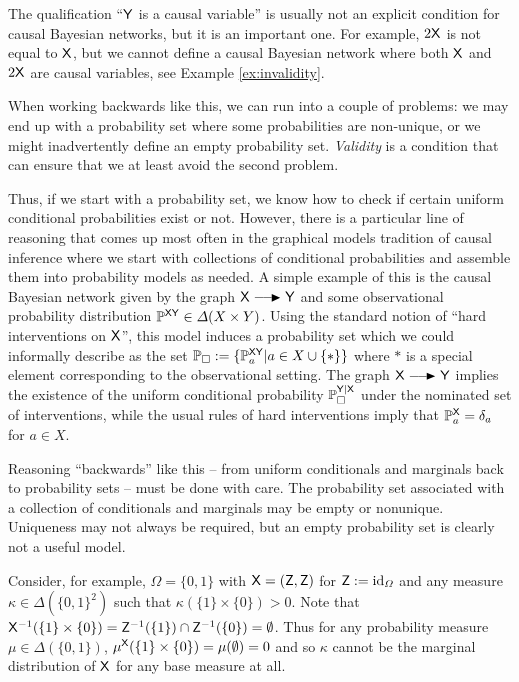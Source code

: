 The qualification ``$\mathsf{Y}$ is a causal variable'' is usually not an explicit condition for causal Bayesian networks, but it is an important one. For example, $2\mathsf{X}$ is not equal to $\mathsf{X}$, but we cannot define a causal Bayesian network where both $\mathsf{X}$ and $2\mathsf{X}$ are causal variables, see Example \ref{ex:invalidity}.

When working backwards like this, we can run into a couple of problems: we may end up with a probability set where some probabilities are non-unique, or we might inadvertently define an empty probability set. \emph{Validity} is a condition that can ensure that we at least avoid the second problem.

Thus, if we start with a probability set, we know how to check if certain uniform conditional probabilities exist or not. However, there is a particular line of reasoning that comes up most often in the graphical models tradition of causal inference where we start with collections of conditional probabilities and assemble them into probability models as needed. A simple example of this is the causal Bayesian network given by the graph $\RV{X}\longrightarrowRHD \RV{Y}$ and some observational probability distribution $\mathbb{P}^{\mathsf{XY}}\in\Delta(X\times Y)$. Using the standard notion of ``hard interventions on $\mathsf{X}$'', this model induces a probability set which we could informally describe as the set $\mathbb{P}_\square:=\{\mathbb{P}_a^{\mathsf{XY}}|a\in X\cup\{*\}\}$ where $*$ is a special element corresponding to the observational setting. The graph $\RV{X}\longrightarrowRHD \RV{Y}$ implies the existence of the uniform conditional probability $\mathbb{P}_\square^{\mathsf{Y}|\mathsf{X}}$ under the nominated set of interventions, while the usual rules of hard interventions imply that $\mathbb{P}_a^{\mathsf{X}} = \delta_a$ for $a\in X$.

Reasoning ``backwards'' like this -- from uniform conditionals and marginals back to probability sets -- must be done with care. The probability set associated with a collection of conditionals and marginals may be empty or nonunique. Uniqueness may not always be required, but an empty probability set is clearly not a useful model.

Consider, for example, $\Omega=\{0,1\}$ with $\mathsf{X}=(\mathsf{Z},\mathsf{Z})$ for $\mathsf{Z}:=\text{id}_{\Omega}$ and any measure $\kappa\in \Delta(\{0,1\}^2)$ such that $\kappa(\{1\}\times \{0\})>0$. Note that $\mathsf{X}^{-1}(\{1\}\times \{0\})=\mathsf{Z}^{-1}(\{1\})\cap \mathsf{Z}^{-1}(\{0\})=\emptyset$. Thus for any probability measure $\mu\in \Delta(\{0,1\})$, $\mu^{\mathsf{X}}(\{1\}\times \{0\}) = \mu(\emptyset)=0 $ and so $\kappa$ cannot be the marginal distribution of $\mathsf{X}$ for any base measure at all.

